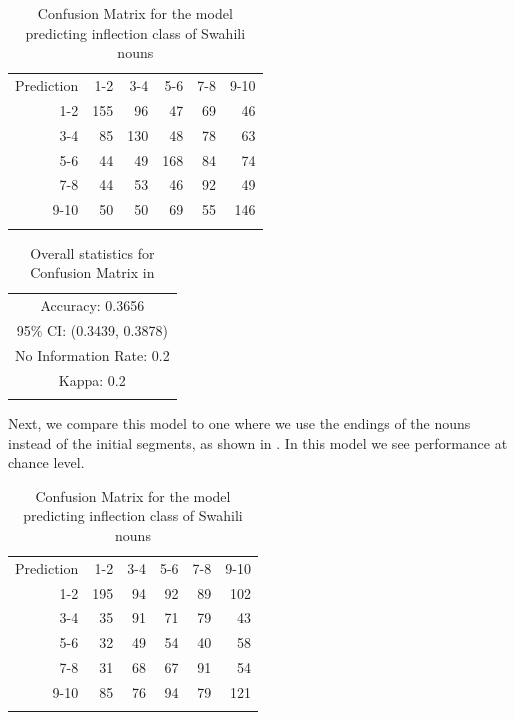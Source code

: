 \begin{table}
  \centering
  \begin{tabular}{rrrrrr}
    \lsptoprule
    \multicolumn{6}{c}{Reference}             \\
    \midrule
    Prediction & 1-2 & 3-4 & 5-6 & 7-8 & 9-10 \\
    1-2        & 155 & 96  & 47  & 69  & 46   \\
    3-4        & 85  & 130 & 48  & 78  & 63   \\
    5-6        & 44  & 49  & 168 & 84  & 74   \\
    7-8        & 44  & 53  & 46  & 92  & 49   \\
    9-10       & 50  & 50  & 69  & 55  & 146  \\
    \lspbottomrule
  \end{tabular}
  \caption{Confusion Matrix for the model predicting inflection class of Swahili nouns}\label{tab:class-swa}
\end{table}

\begin{table}
  \centering
  \begin{tabular}{lllrrr}
    \lsptoprule
    \multicolumn{6}{c}{Overall statistics:} \\

    \midrule
    \multicolumn{6}{c}{Accuracy: 0.3656}            \\
    \multicolumn{6}{c}{95\% CI: (0.3439, 0.3878)}   \\
    \multicolumn{6}{c}{No Information Rate: 0.2} \\
    \multicolumn{6}{c}{Kappa: 0.2}               \\
    \lspbottomrule
  \end{tabular}
  \caption{Overall statistics for Confusion Matrix in }\label{tab:class-swa-stats}
\end{table}

Next, we compare this model to one where we use the endings of the nouns instead of the initial segments, as shown in . In this model we see performance at chance level.

\begin{table}
  \centering
  \begin{tabular}{rrrrrr}
    \lsptoprule
    \multicolumn{6}{c}{Reference}             \\
    \midrule
    Prediction & 1-2 & 3-4 & 5-6 & 7-8 & 9-10 \\
    1-2        & 195 & 94  & 92  & 89  & 102  \\
    3-4        & 35  & 91  & 71  & 79  & 43   \\
    5-6        & 32  & 49  & 54  & 40  & 58   \\
    7-8        & 31  & 68  & 67  & 91  & 54   \\
    9-10       & 85  & 76  & 94  & 79  & 121  \\
    \lspbottomrule
  \end{tabular}
  \caption{Confusion Matrix for the model predicting inflection class of Swahili nouns}\label{tab:class-swa-last}
\end{table}

